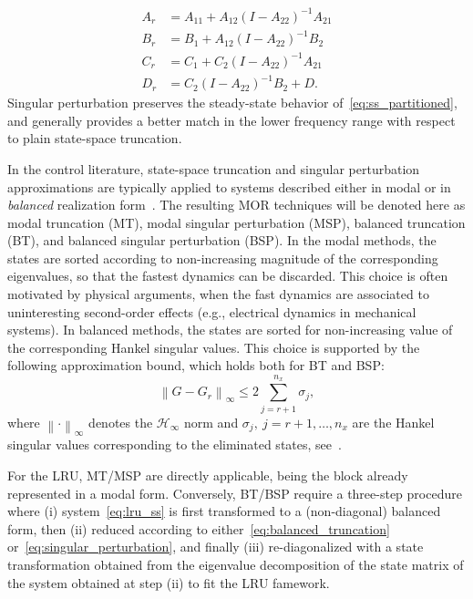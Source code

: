 \documentclass{article} %
\newcommand{\norm}[1]{\left\lVert#1\right\rVert}
\newcommand{\range}[2]{{#1},\ldots, {#2}}
\newcommand{\hinf}{\mathcal{H}_{\infty}}
\newcommand{\nx}{{n_x}}
\begin{document}
\begin{subequations}   
\label{eq:singular_perturbation}
\begin{align}
    A_r &= A_{11} + A_{12}(I - A_{22})^{-1}A_{21}\\
    B_r &= B_1 + A_{12} (I - A_{22})^{-1} B_2 \\
    C_r &= C_1 + C_2 (I - A_{22})^{-1} A_{21} \\
    D_r &= C_2 (I - A_{22})^{-1} B_2 + D.
\end{align}
\end{subequations}
Singular perturbation preserves the steady-state behavior of~\eqref{eq:ss_partitioned}, and generally provides a better match in the lower frequency range with respect to plain state-space truncation.

In the control literature, state-space truncation and singular perturbation approximations are typically applied to systems described either in modal or in \emph{balanced} realization form~\cite{green12}. The resulting MOR techniques will be denoted here as modal truncation (MT), modal singular perturbation (MSP), balanced truncation (BT), and balanced singular perturbation (BSP).
In the modal methods, the states are sorted according to non-increasing magnitude of the corresponding eigenvalues, so that the fastest dynamics can be discarded. This choice is often motivated by physical arguments, when the fast dynamics are associated to uninteresting second-order effects (e.g., electrical dynamics in mechanical systems). In balanced methods, the states are sorted for non-increasing value of the corresponding Hankel singular values. This choice is supported by the following approximation bound, which holds both for BT and BSP:
\begin{equation}
\label{eq:hinf_error_bound}
\norm{G-G_r}_{\infty} \leq 2\sum \limits_{j=r+1}^{\nx}\sigma_j,
\end{equation}
where $\norm{\cdot}_{\infty}$ denotes the $\hinf$ norm and $\sigma_j, \ j=\range{r+1}{\nx}$ are the Hankel singular values corresponding to the eliminated states, see~\cite[Lemma $3.7$]{katayama05}.

For the LRU, MT/MSP are directly applicable, being the block already represented in a modal form. Conversely, BT/BSP require a three-step procedure where (i) system~\eqref{eq:lru_ss} is first transformed to a (non-diagonal) balanced form, then (ii) reduced according to either~\eqref{eq:balanced_truncation} or~\eqref{eq:singular_perturbation}, and finally (iii) re-diagonalized with a state transformation obtained from the eigenvalue decomposition of the state matrix of the system obtained at step (ii) to fit the LRU famework.
\end{document}
